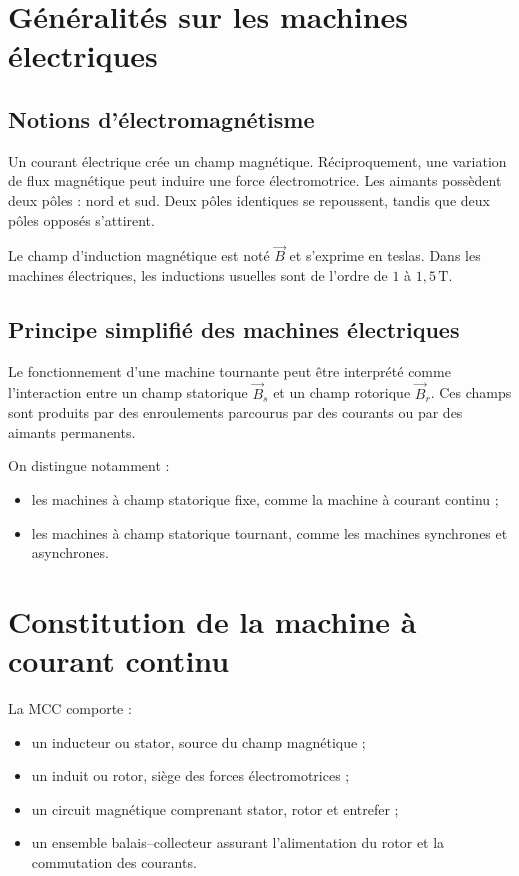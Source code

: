 
\section{Généralités sur les machines électriques}\label{sec:mcc-generalites}

\subsection{Notions d'électromagnétisme}

Un courant électrique crée un champ magnétique. Réciproquement, une variation de flux
magnétique peut induire une force électromotrice. Les aimants possèdent deux pôles : nord et
sud. Deux pôles identiques se repoussent, tandis que deux pôles opposés s'attirent.

Le champ d'induction magnétique est noté $\vec B$ et s'exprime en teslas. Dans les machines
électriques, les inductions usuelles sont de l'ordre de $1$ à $1{,}5\,\mathrm T$.

\subsection{Principe simplifié des machines électriques}

Le fonctionnement d'une machine tournante peut être interprété comme l'interaction entre un
champ statorique $\vec B_s$ et un champ rotorique $\vec B_r$. Ces champs sont produits par des
enroulements parcourus par des courants ou par des aimants permanents.

On distingue notamment :
\begin{itemize}
  \item les machines à champ statorique fixe, comme la machine à courant continu ;
  \item les machines à champ statorique tournant, comme les machines synchrones et asynchrones.
\end{itemize}

\section{Constitution de la machine à courant continu}\label{sec:mcc-constitution}

La MCC comporte :
\begin{itemize}
  \item un inducteur ou stator, source du champ magnétique ;
  \item un induit ou rotor, siège des forces électromotrices ;
  \item un circuit magnétique comprenant stator, rotor et entrefer ;
  \item un ensemble balais--collecteur assurant l'alimentation du rotor et la commutation des courants.
\end{itemize}

